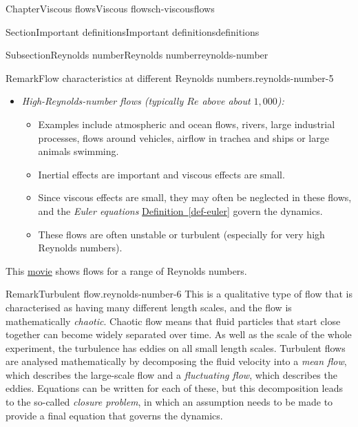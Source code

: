 \documentclass[oneside,10pt,]{book}
\newcommand{\xreffont}{\relax}
\numberwithin{equation}{section}
\begin{document}
\begin{chapterptx}{Chapter}{Viscous flows}{}{Viscous flows}{}{}{ch-viscousflows}
\begin{sectionptx}{Section}{Important definitions}{}{Important definitions}{}{}{definitions}
\begin{subsectionptx}{Subsection}{Reynolds number}{}{Reynolds number}{}{}{reynolds-number}
\begin{remark}{Remark}{Flow characteristics at different Reynolds numbers.}{reynolds-number-5}
\begin{itemize}[label=\textbullet]
\begin{itemize}[label=$\circ$]
\item{}Examples include flows in most blood vessels that are not capillaries, small fish swimming, not-too-fast flow out of a domestic tap, stirring a cup of tea.%
\item{}Flows in pipes with moderate Reynolds number are often described as \emph{laminar}, meaning that the fluid moves in ‘layers’ sliding past each other (in fluid dynamics, the word ‘laminar’ is often used to mean that the flow is not \emph{turbulent}).%
\end{itemize}
%
\item{}\emph{High-Reynolds-number flows (typically \(Re\) above about \(1{,}000\)):}%
\begin{itemize}[label=$\circ$]
\item{}Examples include atmospheric and ocean flows, rivers, large industrial processes, flows around vehicles, airflow in trachea and ships or large animals swimming.%
\item{}Inertial effects are important and viscous effects are small.%
\item{}Since viscous effects are small, they may often be neglected in these flows, and the \emph{Euler equations} \hyperref[def-euler]{Definition~{\xreffont\ref{def-euler}}} govern the dynamics.%
\item{}These flows are often unstable or turbulent (especially for very high Reynolds numbers).%
\end{itemize}
%
\end{itemize}
This \href{https://www-cambridge-org.ezproxy1.bath.ac.uk/core/homsy/category/67}{movie} shows flows for a range of Reynolds numbers.%
\end{remark}
\begin{remark}{Remark}{Turbulent flow.}{reynolds-number-6}%
This is a qualitative type of flow that is characterised as having many different length scales, and the flow is mathematically \emph{chaotic}. Chaotic flow means that fluid particles that start close together can become widely separated over time. As well as the scale of the whole experiment, the turbulence has eddies on all small length scales. Turbulent flows are analysed mathematically by decomposing the fluid velocity into a \emph{mean flow}, which describes the large-scale flow and a \emph{fluctuating flow}, which describes the eddies. Equations can be written for each of these, but this decomposition leads to the so-called \emph{closure problem}, in which an assumption needs to be made to provide a final equation that governs the dynamics.%

\end{remark}
\end{subsectionptx}
\end{sectionptx}
\end{chapterptx}
\end{document}
